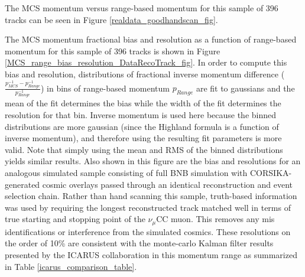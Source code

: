 \documentclass[a4paper,11pt]{article}
\begin{document}
The MCS momentum versus range-based momentum for this sample of 396 tracks can be seen in Figure \ref{realdata_goodhandscan_fig}.







The MCS momentum fractional bias and resolution as a function of range-based momentum for this sample of 396 tracks is shown in Figure \ref{MCS_range_bias_resolution_DataRecoTrack_fig}. In order to compute this bias and resolution, distributions of fractional inverse momentum difference ($\frac{p_{MCS}^{-1} - p_{Range}^{-1}}{p_{Range}^{-1}}$) in bins of range-based momentum $p_{Range}$ are fit to gaussians and the mean of the fit determines the bias while the width of the fit determines the resolution for that bin. Inverse momentum is used here because the binned distributions are more gaussian (since the Highland formula is a function of inverse momentum), and therefore using the resulting fit parameters is more valid. Note that simply using the mean and RMS of the binned distributions yields similar results. Also shown in this figure are the bias and resolutions for an analogous simulated sample consisting of full BNB simulation with CORSIKA-generated \cite{corsika_ref} cosmic overlays passed through an identical reconstruction and event selection chain. Rather than hand scanning this sample, truth-based information was used by requiring the longest reconstructed track matched well in terms of true starting and stopping point of the $\nu_\mu$CC muon. This removes any mis identifications or interference from the simulated cosmics. These resolutions on the order of 10\% are consistent with the monte-carlo Kalman filter results presented by the ICARUS collaboration in this momentum range \cite{icarus_mcs_paper} as summarized in Table \ref{icarus_comparison_table}.\\
\end{document}
